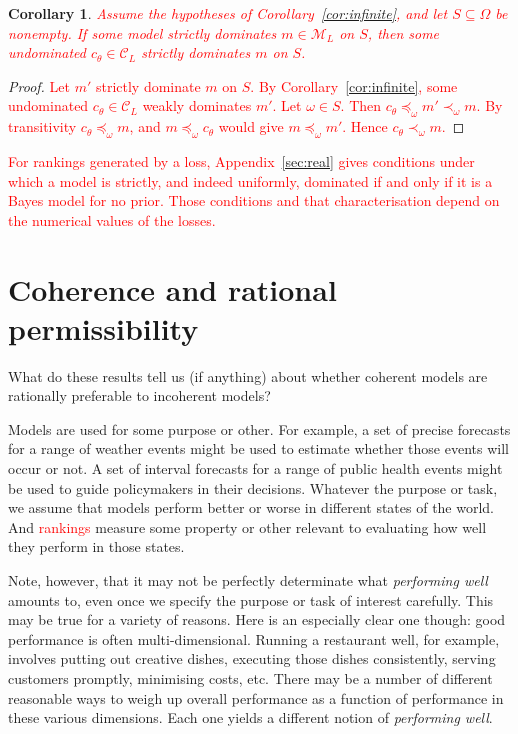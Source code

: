 \documentclass[11pt]{article}
\newtheorem{corollary}[theorem]{Corollary}
\theoremstyle{definition}
\theoremstyle{remark}
\newcommand{\M}{\mathcal M}
\newcommand{\C}{\mathcal C}
\begin{document}
\begin{corollary}\label{cor:strict-ordinal}
\textcolor{red}{Assume the hypotheses of Corollary~\ref{cor:infinite}, and let $S\subseteq\Omega$ be nonempty. If some model strictly dominates $m\in\M_L$ on $S$, then some undominated $c_\theta\in\C_L$ strictly dominates $m$ on $S$.}
\end{corollary}
\begin{proof}
\textcolor{red}{Let $m'$ strictly dominate $m$ on $S$. By Corollary~\ref{cor:infinite}, some undominated $c_\theta\in\C_L$ weakly dominates $m'$. Let $\omega\in S$. Then $c_\theta\preceq_\omega m'\prec_\omega m$. By transitivity $c_\theta\preceq_\omega m$, and $m\preceq_\omega c_\theta$ would give $m\preceq_\omega m'$. Hence $c_\theta\prec_\omega m$.}
\end{proof}
\textcolor{red}{For rankings generated by a loss, Appendix~\ref{sec:real} gives conditions under which a model is strictly, and indeed uniformly, dominated if and only if it is a Bayes model for no prior. Those conditions and that characterisation depend on the numerical values of the losses.}



\section{Coherence and rational permissibility}\label{sec:argument}

What do these results tell us (if anything) about whether coherent models are rationally preferable to incoherent models?

Models are used for some purpose or other. For example, a set of precise forecasts for a range of weather events might be used to estimate whether those events will occur or not. A set of interval forecasts for a range of public health events might be used to guide policymakers in their decisions. Whatever the purpose or task, we assume that models perform better or worse in different states of the world. And \textcolor{red}{rankings} measure some property or other relevant to evaluating how well they perform in those states. 

Note, however, that it may not be perfectly determinate what \textit{performing well} amounts to, even once we specify the purpose or task of interest carefully. This may be true for a variety of reasons. Here is an especially clear one though: good performance is often multi-dimensional. Running a restaurant well, for example, involves putting out creative dishes, executing those dishes consistently, serving customers promptly, minimising costs, etc. There may be a number of different reasonable ways to weigh up overall performance as a function of performance in these various dimensions. Each one yields a different notion of \textit{performing well}.
\end{document}
